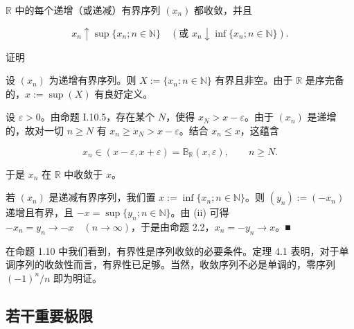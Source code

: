 \begin{theorem}

$ \mathbb{R} $ 中的每个递增（或递减）有界序列  $ (x_{n}) $ 都收敛，并且

\[
{x}_{n}\uparrow\operatorname*{s u p}\{{x}_{n};{n}\in\mathbb{N}\}\quad\left(\text{或 }{x}_{n}\downarrow\operatorname*{i n f}\{{x}_{n};{n}\in\mathbb{N}\}\right).
\]

证明

\begin{subitems}
\item

设  $ (x_n) $ 为递增有界序列。则  $ X := \{x_n : n \in \mathbb{N}\} $ 有界且非空。由于  $ \mathbb{R} $ 是序完备的，$ x := \sup(X) $ 有良好定义。

\item

设  $ \varepsilon > 0 $。由命题 I.10.5，存在某个  $ N $，使得  $ x_N > x - \varepsilon $。由于  $ (x_n) $ 是递增的，故对一切  $ n \geq N $ 有  $ x_n \geq x_N > x - \varepsilon $。结合  $ x_n \leq x $，这蕴含

\[
x_{n}\in(x-\varepsilon,x+\varepsilon)=\mathbb{B}_{\mathbb{R}}(x,\varepsilon),\qquad n\geq N.
\]

于是 $x_{n}$ 在 $\mathbb{R}$ 中收敛于 $x$。

\item

若 $(x_n)$ 是递减有界序列，我们置 $x := \inf\{x_n ; n \in \mathbb{N}\}$。则 $(y_n) := (-x_n)$ 递增且有界，且 $-x = \sup\{y_n ; n \in \mathbb{N}\}$。由 (ii) 可得 $-x_n = y_n \to -x \quad (n \to \infty)$，于是由命题 2.2，$x_n = -y_n \to x$。■

\end{subitems}

\end{theorem}

在命题 1.10 中我们看到，有界性是序列收敛的必要条件。定理 4.1 表明，对于单调序列的收敛性而言，有界性已足够。当然，收敛序列不必是单调的，零序列  $ (-1)^{n}/n $ 即为明证。

\subsection*{若干重要极限}


